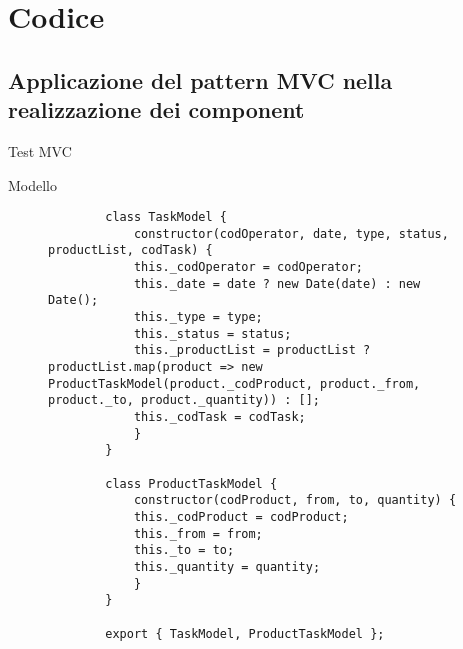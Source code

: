\section{Codice}
\subsection{Applicazione del pattern MVC nella realizzazione dei component}

Test MVC


Modello
\begin{figure}[H]
    \centering
    \begin{verbatim}
        class TaskModel {
            constructor(codOperator, date, type, status, productList, codTask) {
            this._codOperator = codOperator;
            this._date = date ? new Date(date) : new Date();
            this._type = type;
            this._status = status;
            this._productList = productList ? productList.map(product => new ProductTaskModel(product._codProduct, product._from, product._to, product._quantity)) : [];
            this._codTask = codTask;
            }
        }
        
        class ProductTaskModel {
            constructor(codProduct, from, to, quantity) {
            this._codProduct = codProduct;
            this._from = from;
            this._to = to;
            this._quantity = quantity;
            }
        }
        
        export { TaskModel, ProductTaskModel };
\end{verbatim}
\end{figure}


